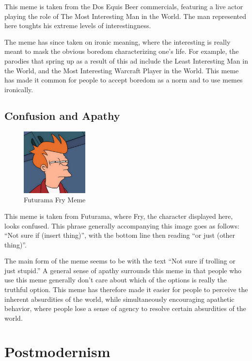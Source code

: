 \documentclass[12pt,letterpaper]{article}
\begin{document}
This meme is taken from the Dos Equis Beer commercials, featuring a live actor playing the role of The Most Interesting Man in the World. The man represented here toughts his extreme levels of interestingness. 

The meme has since taken on ironic meaning, where the interesting is really meant to mask the obvious boredom characterizing one's life.  For example, the parodies that spring up as a result of this ad include the Least Interesting Man in the World, and the Most Interesting Warcraft Player in the World.  This meme has made it common for people to accept boredom as a norm and to use memes ironically.

\subsection{Confusion and Apathy}

\begin{figure}[!h]
	\centering
	\includegraphics[width=0.3\textwidth]{graphics/8}
	\caption{Futurama Fry Meme}
	\label{5}
\end{figure}

This meme is taken from Futurama, where Fry, the character displayed here, looks confused.  This phrase generally accompanying this image goes as follows: “Not sure if (insert thing)”, with the bottom line then reading “or just (other thing)”. 

The main form of the meme seems to be with the text “Not sure if trolling or just stupid.”  A general sense of apathy surrounds this meme in that people who use this meme generally don't care about which of the options is really the truthful option.  This meme has therefore made it easier for people to perceive the inherent absurdities of the world, while simultaneously encouraging apathetic behavior, where people lose a sense of agency to resolve certain absurdities of the world. 

\section{Postmodernism}
\end{document}
